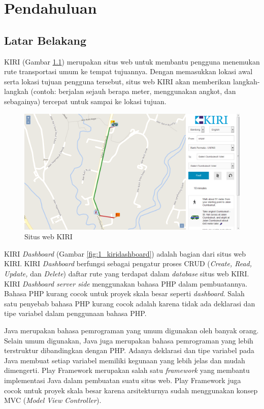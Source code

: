 \chapter{Pendahuluan}
\label{chap:pendahuluan}

\section{Latar Belakang}
\label{sec:latar_belakang}
KIRI\cite{kiritravel} (Gambar \ref{fig:1_kiritravel}) merupakan situs web untuk membantu pengguna menemukan rute transportasi umum ke tempat tujuannya. Dengan memasukkan lokasi awal serta lokasi tujuan pengguna tersebut, situs web KIRI akan memberikan langkah-langkah (contoh: berjalan sejauh berapa meter, menggunakan angkot, dan sebagainya) tercepat untuk sampai ke lokasi tujuan.

\begin{figure}[htbp]
	\centering
		\includegraphics[scale=0.35]{Gambar/1_kiritravel.png}
	\caption{Situs web KIRI\cite{kiritravel}}
	\label{fig:1_kiritravel}
\end{figure}

KIRI \textit{Dashboard}\cite{devkiritravel} (Gambar \ref{fig:1_kiridashboard}) adalah bagian dari situs web KIRI. KIRI \textit{Dashboard} berfungsi sebagai pengatur proses CRUD (\textit{Create, Read, Update,} dan \textit{Delete}) daftar rute yang terdapat dalam \textit{database} situs web KIRI. KIRI \textit{Dashboard server side} menggunakan bahasa PHP dalam pembuatannya\cite{kiridashboard}. Bahasa PHP kurang cocok untuk proyek skala besar seperti \textit{dashboard}. Salah satu penyebab bahasa PHP kurang cocok adalah karena tidak ada deklarasi dan tipe variabel dalam penggunaan bahasa PHP.

Java merupakan bahasa pemrograman yang umum digunakan oleh banyak orang. Selain umum digunakan, Java juga merupakan bahasa pemrograman yang lebih terstruktur dibandingkan dengan PHP. Adanya deklarasi dan tipe variabel pada Java membuat setiap variabel memiliki kegunaan yang lebih jelas dan mudah dimengerti. Play Framework merupakan salah satu \textit{framework} yang membantu implementasi Java dalam pembuatan suatu situs web. Play Framework juga cocok untuk proyek skala besar karena arsitekturnya sudah menggunakan konsep MVC (\textit{Model View Controller})\cite{playforjava}.

